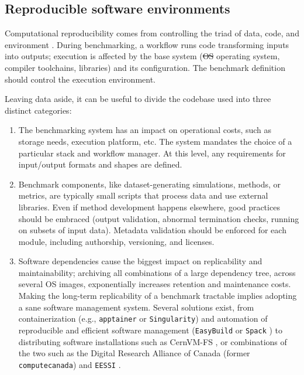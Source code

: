 \documentclass[11pt]{article}
\begin{document}
\subsection*{Reproducible software environments \label{softwareenvs}}

Computational reproducibility comes from controlling the triad of data, code, and environment \cite{Hill2024-gf}. During benchmarking, a workflow runs code transforming inputs into outputs; execution is affected by the base system ({\color{red}\sout{OS} operating system}, compiler toolchains, libraries) and its configuration. The benchmark definition should control the execution environment.

Leaving data aside, it can be useful to divide the codebase used into three distinct categories:

\begin{enumerate}
\item The benchmarking system has an impact on operational costs, such as storage needs, execution platform, etc.  The system mandates the choice of a particular stack and workflow manager. At this level, any requirements for input/output formats and shapes are defined.

\item Benchmark components, like dataset-generating simulations, methods, or metrics, are typically small scripts that process data and use external libraries. Even if method development happens elsewhere, good practices should be embraced (output validation, abnormal termination checks, running on subsets of input data).  Metadata validation should be enforced for each module, including authorship, versioning, and licenses.

\item Software dependencies cause the biggest impact on replicability and maintainability; archiving all combinations of a large dependency tree, across several OS images, exponentially increases retention and maintenance costs. Making the long-term replicability of a benchmark tractable implies adopting a sane software management system. Several solutions exist, from containerization (e.g., \texttt{apptainer} or \texttt{Singularity}) \cite{Kurtzer2017-mn} and automation of reproducible and efficient software management (\texttt{EasyBuild} \cite{Hoste2012-gg} or \texttt{Spack} \cite{Gamblin2015-ll}) to distributing software installations such as CernVM-FS \cite{Blomer2013-jk},  or combinations of the two such as the Digital Research Alliance of Canada (former \texttt{computecanada}) \cite{Boissonneault2019-wm} and \texttt{EESSI} \cite{droge2023-ax}.

\end{enumerate}
\end{document}
